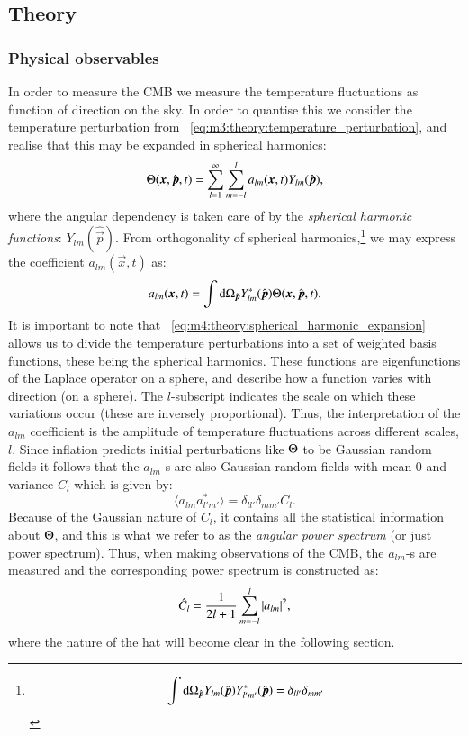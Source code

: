 \subsection{Theory}\label{sec:m4:theory}
    \subsubsection{Physical observables}
        In order to measure the CMB we measure the temperature fluctuations as function of direction on the sky. In order to quantise this we consider the temperature perturbation from ~\cref{eq:m3:theory:temperature_perturbation}, and realise that this may be expanded in spherical harmonics:
        \begin{equation}\label{eq:m4:theory:spherical_harmonic_expansion}
            \Theta(\boldsymbol{x}, \hat{\boldsymbol{p}}, t) = \sum_{l=1}^\infty\sum_{m=-l}^l a_{lm}(\boldsymbol{x}, t)Y_{lm}(\hat{\boldsymbol{p}}),
        \end{equation}
        where the angular dependency is taken care of by the \textit{spherical harmonic functions}: $Y_{lm}(\hat{\vec{p}})$. From orthogonality of spherical harmonics,\footnote{$$\int\mathrm{d}\Omega_{\hat{\boldsymbol{p}}}Y_{lm}(\hat{\boldsymbol{p}})Y^*_{l'm'}(\hat{\boldsymbol{p}}) = \delta_{ll'}\delta_{mm'}$$} we may express the coefficient $a_{lm}(\vec{x},t)$ as:
        \begin{equation}\label{eq:m4:theory:alm_coefficients}
            a_{lm}(\boldsymbol{x},t) = \int\mathrm{d}\Omega_{\hat{\boldsymbol{p}}}Y^*_{lm}(\hat{\boldsymbol{p}})\Theta(\boldsymbol{x}, \hat{\boldsymbol{p}},t).
        \end{equation}
        It is important to note that ~\cref{eq:m4:theory:spherical_harmonic_expansion} allows us to divide the temperature perturbations into a set of weighted basis functions, these being the spherical harmonics. These functions are eigenfunctions of the Laplace operator on a sphere, and describe how a function varies with direction (on a sphere). The $l$-subscript indicates the scale on which these variations occur (these are inversely proportional). Thus, the interpretation of the $a_{lm}$ coefficient is the amplitude of temperature fluctuations across different scales, $l$. Since inflation predicts initial perturbations like $\Theta$ to be Gaussian random fields it follows that the $a_{lm}$-s are also Gaussian random fields with mean 0 and variance $C_l$ which is given by: 
        \begin{equation}\label{eq:m4:theory:alm_coeff_variance}
            \langle a_{lm}a^*_{l'm'}\rangle = \delta_{ll'}\delta_{mm'}C_l.
        \end{equation}
        Because of the Gaussian nature of $C_l$, it contains all the statistical information about $\Theta$, and this is what we refer to as the \textit{angular power spectrum} (or just power spectrum). Thus, when making observations of the CMB, the $a_{lm}$-s are measured and the corresponding power spectrum is constructed as:
        \begin{equation}
            \hat{C}_l = \frac{1}{2l+1}\sum_{m=-l}^l\abs{a_{lm}}^2,
        \end{equation}
        where the nature of the hat will become clear in the following section. 

